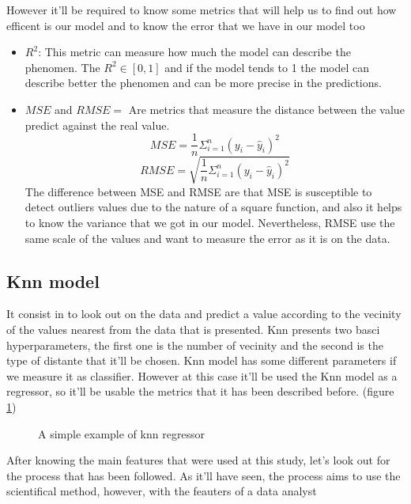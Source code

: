 \documentclass{article}
\begin{document}
However it'll be required to know some metrics that will help us to find out how efficent is our model and to know the error that we have in our model too
\begin{itemize}
  \item $R^2$: This metric can measure how much the model can describe the phenomen. The $R^2 \in [0,1]$ and if the model tends to 1 the model can describe better the phenomen and can be more precise in the predictions.
  \item $MSE$ and $RMSE = $ Are metrics that measure the distance between the value predict against the real value.
  $$MSE=\frac{1}{n}\Sigma^{n}_{i=1}(y_i-\hat{y}_i)^2 $$
    $$RMSE=\sqrt{\frac{1}{n}\Sigma^{n}_{i=1}(y_i-\hat{y}_i)^2} $$
    The difference between MSE and RMSE are that MSE is susceptible to detect outliers values due to the nature of a square function, and also it helps to know the variance that we got in our model. Nevertheless, RMSE use the same scale of the values and want to measure the error as it is on the data.

\end{itemize}

\subsection{Knn model}
It consist in to look out on the data and predict a value according to the vecinity of the values nearest from the data that is presented. Knn presents two basci hyperparameters, the first one is the number of vecinity and the second is the type of distante that it'll be chosen.
Knn model has some different parameters if we measure it as classifier. However at this case it'll be used the Knn model as a regressor, so it'll be usable the metrics that it has been described before.
(figure \ref{fig:example4})
\begin{figure}[h]
  \centering
{}

  \caption{A simple example of knn regressor}
  \label{fig:example4}
\end{figure}
After knowing the main features that were used at this study, let's look out for the process that has been followed. As it'll have seen, the process aims to use the scientifical method, however, with the feauters of a data analyst
\end{document}
